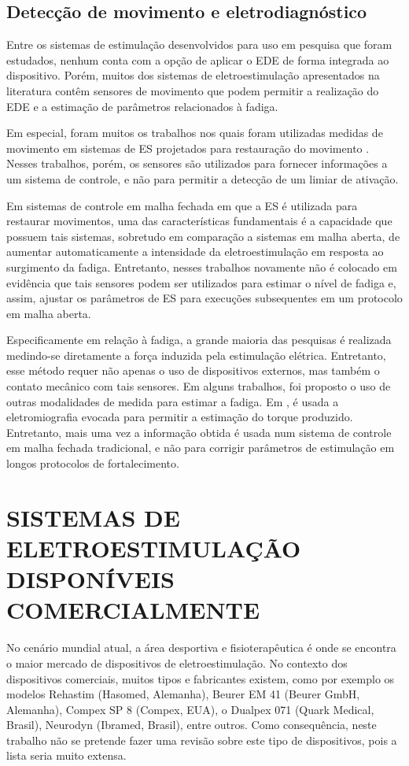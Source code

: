 \subsection{Detecção de movimento e eletrodiagnóstico}\label{cap:sec3.2.6}
Entre os sistemas de estimulação desenvolvidos para uso em pesquisa que foram estudados, nenhum conta com a opção de aplicar o EDE de forma integrada ao dispositivo. Porém, muitos dos sistemas de eletroestimulação apresentados na literatura contêm sensores de movimento que podem permitir a realização do EDE e a estimação de parâmetros relacionados à fadiga.

Em especial, foram muitos os trabalhos nos quais foram utilizadas medidas de movimento em sistemas de ES projetados para restauração do movimento \cite{Bo2016, Catunda2016,Ferrarin2001,Sharma2009,Schauer2005, Kobravi2009}. Nesses trabalhos, porém, os sensores são utilizados para fornecer informações a um sistema de controle, e não para permitir a detecção de um limiar de ativação.  %

Em sistemas de controle em malha fechada em que a ES é utilizada para restaurar movimentos, uma das características fundamentais é a capacidade que possuem tais sistemas, sobretudo em comparação a sistemas em malha aberta, de aumentar automaticamente a intensidade da eletroestimulação em resposta ao surgimento da fadiga. Entretanto, nesses trabalhos novamente não é colocado em evidência que tais sensores podem ser utilizados para estimar o nível de fadiga e, assim, ajustar os parâmetros de ES para execuções subsequentes em um protocolo em malha aberta.

Especificamente em relação à fadiga, a grande maioria das pesquisas é realizada medindo-se diretamente a força induzida pela estimulação elétrica. Entretanto, esse método requer não apenas o uso de dispositivos externos, mas também o contato mecânico com tais sensores. Em alguns trabalhos, foi proposto o uso de outras modalidades de medida para estimar a fadiga. Em \cite{Zhang2011}, é usada a eletromiografia evocada para permitir a estimação do torque produzido. Entretanto, mais uma vez a informação obtida é usada num sistema de controle em malha fechada tradicional, e não para corrigir parâmetros de estimulação em longos protocolos de fortalecimento.

\section{SISTEMAS DE ELETROESTIMULAÇÃO DISPONÍVEIS COMERCIALMENTE}
No cenário mundial atual, a área desportiva e fisioterapêutica é onde se encontra o maior mercado de dispositivos de eletroestimulação. No contexto dos dispositivos comerciais, muitos tipos e fabricantes existem, como por exemplo os modelos Rehastim (Hasomed, Alemanha), Beurer EM 41 (Beurer GmbH, Alemanha), Compex SP 8 (Compex, EUA), o Dualpex 071 (Quark Medical, Brasil), Neurodyn (Ibramed, Brasil), entre outros.  Como consequência, neste trabalho não se pretende fazer uma revisão sobre este tipo de dispositivos, pois a lista seria muito extensa. 

